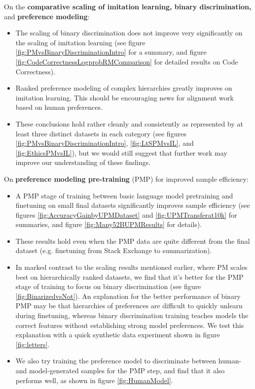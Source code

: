 On the {\bf comparative scaling of imitation learning, binary discrimination,} and {\bf preference modeling}:

\begin{itemize}
    \item The scaling of binary discrimination does not  improve very significantly on the scaling of  imitation learning (see figure \ref{fig:PMvsBinaryDiscriminationIntro} for a summary, and figure \ref{fig:CodeCorrectnessLogprobRMComparison} for detailed results on Code Correctness).
    \item Ranked preference modeling of complex hierarchies greatly improves on imitation learning.  This should be encouraging news for alignment work based on human preferences.
    \item These conclusions hold rather cleanly and consistently as represented by at least three distinct datasets in each category (see figures \ref{fig:PMvsBinaryDiscriminationIntro}, \ref{fig:LtSPMvsIL}, and \ref{fig:EthicsPMvsIL}), but we would still suggest that further work may improve our understanding of these findings.
\end{itemize}

On {\bf preference modeling pre-training} (PMP) for improved sample efficiency:

\begin{itemize}
    \item A PMP stage of training between basic language model pretraining and finetuning on small final datasets significantly improves sample efficiency (see figures \ref{fig:AccuracyGainbyUPMDataset} and \ref{fig:UPMTransferat10k} for summaries, and figure \ref{fig:Many52BUPMResults} for details).  
    \item These results hold even when the PMP data are quite different from the final dataset (e.g. finetuning from Stack Exchange to summarization).
    \item In marked contrast to the scaling results mentioned earlier, where PM scales best on hierarchically ranked datasets, we find that it's better for the PMP stage of training to focus on binary discrimination (see figure \ref{fig:BinarizedvsNot}).  An  explanation for the better performance of binary PMP may be that hierarchies of preferences are difficult to quickly unlearn during finetuning, whereas binary discrimination training teaches models the correct features without establishing strong model preferences. We  test this explanation  with a quick synthetic data experiment shown in figure \ref{fig:letters}.
    \item We also try training the preference model to discriminate between human- and model-generated samples for the PMP step, and find that it also performs well, as shown in figure \ref{fig:HumanModel}.  
\end{itemize}

